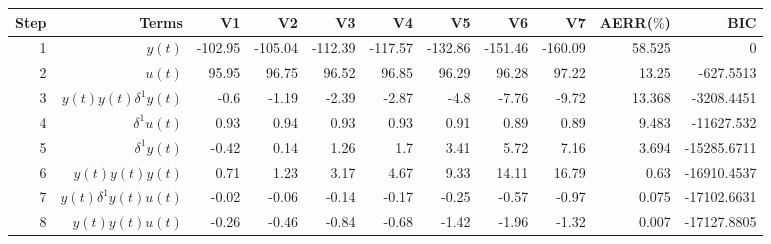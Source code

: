 \begin{tabular}{rrrrrrrrrrr}
Step & Terms & V1 & V2 & V3 & V4 & V5 & V6 & V7 & AERR($\%$) & BIC \\ 
\hline 
1 & $y(t)$ & -102.95 & -105.04 & -112.39 & -117.57 & -132.86 & -151.46 & -160.09 & 58.525 & 0 \\ 
2 & $u(t)$ & 95.95 & 96.75 & 96.52 & 96.85 & 96.29 & 96.28 & 97.22 & 13.25 & -627.5513 \\ 
3 & $y(t)y(t)\delta^1 y(t)$ & -0.6 & -1.19 & -2.39 & -2.87 & -4.8 & -7.76 & -9.72 & 13.368 & -3208.4451 \\ 
4 & $\delta^1 u(t)$ & 0.93 & 0.94 & 0.93 & 0.93 & 0.91 & 0.89 & 0.89 & 9.483 & -11627.532 \\ 
5 & $\delta^1 y(t)$ & -0.42 & 0.14 & 1.26 & 1.7 & 3.41 & 5.72 & 7.16 & 3.694 & -15285.6711 \\ 
6 & $y(t)y(t)y(t)$ & 0.71 & 1.23 & 3.17 & 4.67 & 9.33 & 14.11 & 16.79 & 0.63 & -16910.4537 \\ 
7 & $y(t)\delta^1 y(t)u(t)$ & -0.02 & -0.06 & -0.14 & -0.17 & -0.25 & -0.57 & -0.97 & 0.075 & -17102.6631 \\ 
8 & $y(t)y(t)u(t)$ & -0.26 & -0.46 & -0.84 & -0.68 & -1.42 & -1.96 & -1.32 & 0.007 & -17127.8805 \\ 
\hline 
\end{tabular}